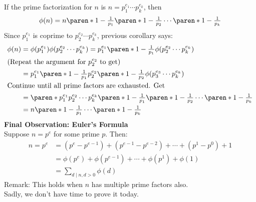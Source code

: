\prop If the prime factorization for $n$ is $n=p_1^{e_1}\dotsm p_k^{e_k}$, then
\[ \phi(n) = n \paren*{1-\tfrac{1}{p_1}} \paren*{1-\tfrac{1}{p_2}} \dotsm \paren*{1-\tfrac{1}{p_k}} \]
\pf Since $p_1^{e_1}$ is coprime to $p_2^{e_2}\dotsm p_k^{e_k}$, previous corollary says:
\begin{align*}
\phi(n) &= \phi(p_1^{e_1})\phi(p_2^{e_2}\dotsm p_k^{e_k}) = p_1^{e_1} \paren*{1-\tfrac{1}{p_1}} \phi(p_2^{e_2}\dotsm p_k^{e_k}) \\
\intertext{(Repeat the argument for $p_2^{e_2}$ to get)}
&= p_1^{e_1} \paren*{1-\tfrac{1}{p_1}} p_2^{e_2} \paren*{1-\tfrac{1}{p_2}} \phi(p_3^{e_3}\dotsm p_k^{e_k}) \\
\intertext{Continue until all prime factors are exhausted.  Get}
&= \paren*{p_1^{e_1}p_2^{e_2}\dotsm p_k^{e_k}} \paren*{1-\tfrac{1}{p_1}} \paren*{1-\tfrac{1}{p_2}} \dotsm \paren*{1-\tfrac{1}{p_k}} \\
&= n \paren*{1-\tfrac{1}{p_1}} \dotsm \paren*{1-\tfrac{1}{p_k}}
\end{align*}
\textbf{Final Observation: Euler's Formula} \\
Suppose $n=p^e$ for some prime $p$.  Then:
\begin{align*}
n = p^e &= (p^e - p^{e-1}) + (p^{e-1} - p^{e-2}) + \dotsb + (p^1-p^0) + 1 \\
&= \phi(p^e) + \phi(p^{e-1}) + \dotsb + \phi(p^1) + \phi(1) \\
&= \sum_{d\mid n, d>0} \phi(d)
\end{align*}
Remark: This holds when $n$ has multiple prime factors also. \\
Sadly, we don't have time to prove it today.
